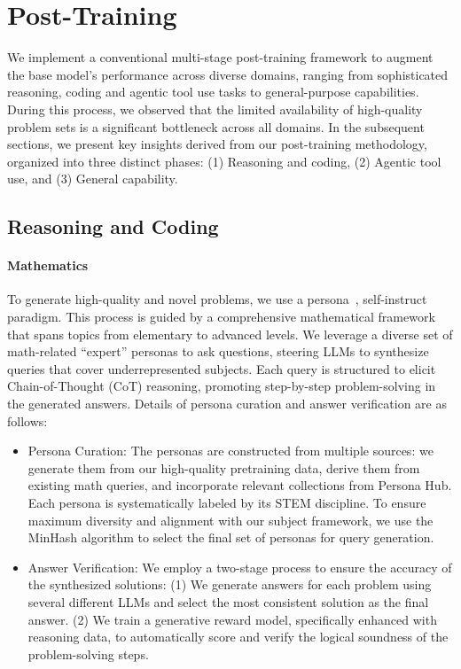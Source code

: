 \documentclass{article}
\begin{document}
\section{Post-Training}

We implement a conventional multi-stage post-training framework to augment the base model's performance across diverse domains, ranging from sophisticated reasoning, coding and agentic tool use tasks to general-purpose capabilities. During this process, we observed that the limited availability of high-quality problem sets is a significant bottleneck across all domains. In the subsequent sections, we present key insights derived from our post-training methodology, organized into three distinct phases: (1) Reasoning and coding, (2) Agentic tool use, and (3) General capability.

\subsection{Reasoning and Coding}
\paragraph{Mathematics}


To generate high-quality and novel problems, we use a persona~\citep{ge2024scaling}, self-instruct~\citep{wang2022self} paradigm. This process is guided by a comprehensive mathematical framework that spans topics from elementary to advanced levels. We leverage a diverse set of math-related ``expert'' personas to ask questions, steering LLMs to synthesize queries that cover underrepresented subjects. Each query is structured to elicit Chain-of-Thought (CoT) reasoning, promoting step-by-step problem-solving in the generated answers. Details of persona curation and answer verification are as follows:

\begin{itemize}
    \item Persona Curation: The personas are constructed from multiple sources: we generate them from our high-quality pretraining data, derive them from existing math queries, and incorporate relevant collections from Persona Hub. Each persona is systematically labeled by its STEM discipline. To ensure maximum diversity and alignment with our subject framework, we use the MinHash algorithm to select the final set of personas for query generation.
    \item Answer Verification: We employ a two-stage process to ensure the accuracy of the synthesized solutions: (1) We generate answers for each problem using several different LLMs and select the most consistent solution as the final answer. (2) We train a generative reward model, specifically enhanced with reasoning data, to automatically score and verify the logical soundness of the problem-solving steps.
\end{itemize}
\end{document}
